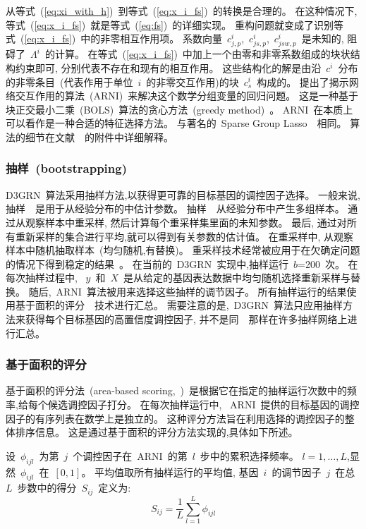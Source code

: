 从等式~(\ref{eq:xi_with_h})~到等式~(\ref{eq:x_i_fs})~的转换是合理的。
在这种情况下,等式~(\ref{eq:x_i_fs})~就是等式~(\ref{eq:fs})~的详细实现。
重构问题就变成了识别等式~(\ref{eq:x_i_fs})~中的非零相互作用项。
系数向量~$c^i_{j,p}$,~$c^i_{js,p}$,~$c^i_{jsw,p}$~是未知的,
阻碍了~$\Lambda^i$~的计算。
在等式~(\ref{eq:x_i_fs})~中加上一个由零和非零系数组成的块状结构约束即可,
分别代表不存在和现有的相互作用。
这些结构化的解是由沿~$c^i$~分布的非零条目~(代表作用于单位~$i$~的非零交互作用)的块~$c^i_s$~构成的。
提出了揭示网络交互作用的算法~(ARNI)~来解决这个数学分组变量的回归问题。
这是一种基于块正交最小二乘~(BOLS)~算法的贪心方法~(greedy method)~\cite{majumdar2009fast}。
ARNI~在本质上可以看作是一种合适的特征选择方法。
与著名的~Sparse Group Lasso~\cite{friedman2010note}~相同。
算法的细节在文献~\cite{casadiego2017model}~的附件中详细解释。

\subsubsection{抽样~(bootstrapping)}

D3GRN~算法采用抽样方法,以获得更可靠的目标基因的调控因子选择。
一般来说,抽样~\cite{efron1994introduction}~是用于从经验分布的中估计参数。
抽样~\cite{efron1994introduction}~从经验分布中产生多组样本。
通过从观察样本中重采样, 然后计算每个重采样集里面的未知参数。
最后, 通过对所有重新采样的集合进行平均,就可以得到有关参数的估计值。
在重采样中, 从观察样本中随机抽取样本~(均匀随机,有替换)。
重采样技术经常被应用于在欠确定问题的情况下得到稳定的结果~\cite{wang2011random}。
在当前的~D3GRN~实现中,抽样运行~$b$=200~次。
在每次抽样过程中, 
~$y$~和~$X$~是从给定的基因表达数据中均匀随机选择重新采样与替换。
随后,~ARNI~算法被用来选择这些抽样的调节因子。
所有抽样运行的结果使用基于面积的评分~\cite{Haury2012}~技术进行汇总。
需要注意的是,~D3GRN~算法只应用抽样方法来获得每个目标基因的高置信度调控因子,
并不是同~\cite{Haury2012}~那样在许多抽样网络上进行汇总。

\subsubsection{基于面积的评分}
基于面积的评分法~(area-based scoring,~\cite{singh2016blars})~是根据它在指定的抽样运行次数中的频率,给每个候选调控因子打分。
在每次抽样运行中, 
~ARNI~提供的目标基因的调控因子的有序列表在数学上是独立的。
这种评分方法旨在利用选择的调控因子的整体排序信息。
这是通过基于面积的评分方法实现的,具体如下所述。

设~$\phi_{ijl}$~为第~$j$~个调控因子在~ARNI~的第~$l$~步中的累积选择频率。
$l={1,\ldots,L}$,显然~$\phi_{ijl}$~在~$[0,1]$。
平均值取所有抽样运行的平均值, 
基因~$i$~的调节因子~$j$~在总~$L$~步数中的得分~$S_{ij}$~定义为:
\begin{equation}
\label{eq:scoring}
S_{ij} = \frac{1}{L} \sum_{l=1}^{L} \phi_{ijl}
\end{equation}

